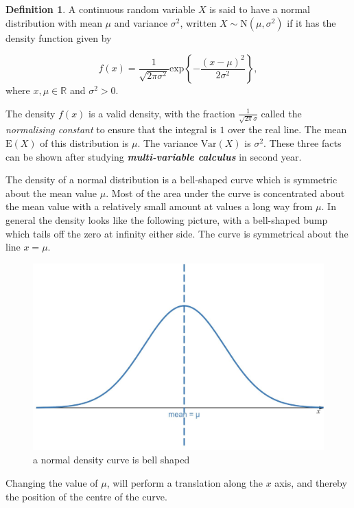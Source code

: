 \documentclass[
]{book}
\theoremstyle{definition}
\newtheorem{definition}{Definition}[chapter]
\theoremstyle{definition}
\theoremstyle{definition}
\theoremstyle{definition}
\theoremstyle{remark}
\begin{document}
\begin{definition}
A continuous random variable \(X\) is said to have a normal distribution with mean \(\mu\) and variance \(\sigma^2\), written \(X\sim \text{N}(\mu,\sigma^2)\) if it has the density function given by

\[ f(x) = \frac{1}{\sqrt{2\pi \sigma^2}}\text{exp}\left\{ -\frac{(x-\mu)^2}{2\sigma^2}\right\}, \]
where \(x, \mu\in \mathbb{R}\) and \(\sigma^2 > 0\).
\end{definition}

The density \(f(x)\) is a valid density, with the fraction \(\frac{1}{\sqrt{2\pi}\sigma}\) called the \emph{normalising constant} to ensure that the integral is \(1\) over the real line. The mean \(\text{E}(X)\) of this distribution is \(\mu\). The variance \(\text{Var}(X)\) is \(\sigma^2\). These three facts can be shown after studying \textbf{\emph{multi-variable calculus}} in second year.

The density of a normal distribution is a bell-shaped curve which is symmetric about the mean value \(\mu\). Most of the area under the curve is concentrated about the mean value with a relatively small amount at values a long way from \(\mu\). In general the density looks like the following picture, with a bell-shaped bump which tails off the zero at infinity either side. The curve is symmetrical about the line \(x=\mu\).

\begin{figure}

{\centering \includegraphics[width=0.75\linewidth]{./figures/norm1} 

}

\caption{a normal density curve is bell shaped}\label{fig:norm1}
\end{figure}

Changing the value of \(\mu\), will perform a translation along the \(x\) axis, and thereby the position of the centre of the curve.
\end{document}
